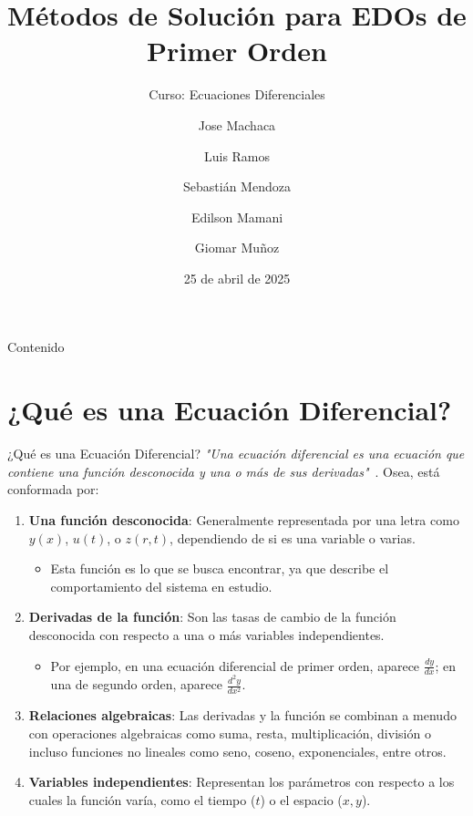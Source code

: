 \documentclass{beamer}
\title[Métodos EDO 1\textsuperscript{er} orden]{Métodos de Solución para EDOs de Primer Orden}
\subtitle{Curso: Ecuaciones Diferenciales}
\author{Jose Machaca \and Luis Ramos \and Sebastián Mendoza \and Edilson Mamani \and Giomar Muñoz}
\date{25 de abril de 2025}
\begin{document}
\begin{frame}
  \titlepage
\end{frame}

\begin{frame}{Contenido}
  \tableofcontents
\end{frame}

\section{¿Qué es una Ecuación Diferencial?}
\begin{frame}{¿Qué es una Ecuación Diferencial?}
\textit{"Una ecuación diferencial es una ecuación que contiene una función desconocida y una o más de sus derivadas"}~\cite{zill2009ecuaciones}.
Osea, está conformada por:
\begin{enumerate}
    \item \textbf{Una función desconocida}: Generalmente representada por una letra como \( y(x) \), \( u(t) \), o \( z(r, t) \), dependiendo de si es una variable o varias.
    \begin{itemize}
        \item Esta función es lo que se busca encontrar, ya que describe el comportamiento del sistema en estudio.
    \end{itemize}

    \item \textbf{Derivadas de la función}: Son las tasas de cambio de la función desconocida con respecto a una o más variables independientes.
    \begin{itemize}
        \item Por ejemplo, en una ecuación diferencial de primer orden, aparece \( \frac{dy}{dx} \); en una de segundo orden, aparece \( \frac{d^2y}{dx^2} \).
    \end{itemize}

    \item \textbf{Relaciones algebraicas}: Las derivadas y la función se combinan a menudo con operaciones algebraicas como suma, resta, multiplicación, división o incluso funciones no lineales como seno, coseno, exponenciales, entre otros.

    \item \textbf{Variables independientes}: Representan los parámetros con respecto a los cuales la función varía, como el tiempo (\(t\)) o el espacio (\(x, y\)).
\end{enumerate}


\end{frame}
\end{document}
